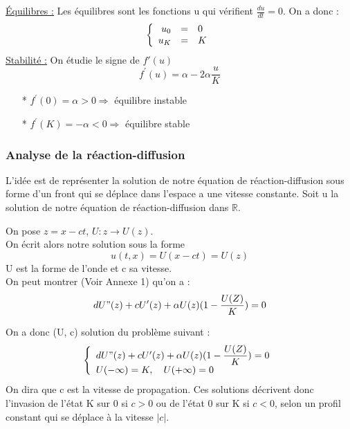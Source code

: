 \documentclass[a4paper,11pt]{article}
\begin{document}
\noindent\underline{Équilibres :} Les équilibres sont les fonctions u qui vérifient $\frac{du}{dt}=0$. On a donc :
\[
\left\{
\begin{array}{r c l}
u_0 &=& 0\\
u_K &=& K\\
\end{array}
\right.
\]
\underline{Stabilité :} On étudie le signe de $f'(u)$ 
$$f^\prime(u)= \alpha - 2 \alpha \dfrac{u}{K} $$

\begin{itemize}
    	\item[*] $f^\prime(0)=\alpha >0 \Rightarrow $ équilibre instable
        \item[*] $f^\prime(K)= -\alpha <0 \Rightarrow $ équilibre stable
	\end{itemize}


\subsubsection{Analyse de la réaction-diffusion}
\setcounter{equation}{0}
L'idée est de représenter la solution de notre équation de
réaction-diffusion sous forme d'un front qui se déplace dans l'espace a une vitesse constante.
Soit u la solution de notre équation de réaction-diffusion dans $\mathbb{R}$.

\noindent On pose $z=x-ct$, $U:z\rightarrow U(z)$.\\
On écrit alors notre solution sous la forme
\begin{equation*}
u(t,x)=U(x-ct)=U(z)
\end{equation*}
U est la forme de l'onde et c sa vitesse.\\

On peut montrer (Voir Annexe 1) qu'on a :
\begin{equation*}
dU"(z)+c U'(z)+\alpha U(z)(1-\dfrac{U(Z)}{K})=0\\
\end{equation*} 

On a donc (U, c) solution du problème suivant :
\begin{equation} 
\left\{
\begin{array}{lcl}
dU"(z)+c U'(z)+\alpha U(z)(1-\dfrac{U(Z)}{K})=0 \\
U( - \infty )= K ,\quad U( + \infty )=0
\end{array}
\right.
\label{PbKPP }
\end{equation}
On dira que c est la vitesse de propagation. Ces solutions décrivent donc l'invasion de l'état K
sur 0 si $c > 0$ ou de l'état 0 sur K si $c< 0$, selon un profil constant qui se déplace à la vitesse
$|c|$.\\
\newline
\end{document}
